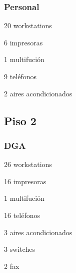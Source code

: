 \documentclass[a4paper,11pt,oneside]{article}
\begin{document}
\subsubsection*{Personal}
\begin{itemize*}
\item 20 workstations
\item 6 impresoras
\item 1 multifución
\item 9 teléfonos
\item 2 aires acondicionados
\end{itemize*}
%
\subsection*{Piso 2}
%
\subsubsection*{DGA}
\begin{itemize*}
\item 26 workstations
\item 16 impresoras
\item 1 multifución
\item 16 teléfonos
\item 3 aires acondicionados
\item 3 switches
\item 2 fax
\end{itemize*}
%
\end{document}
